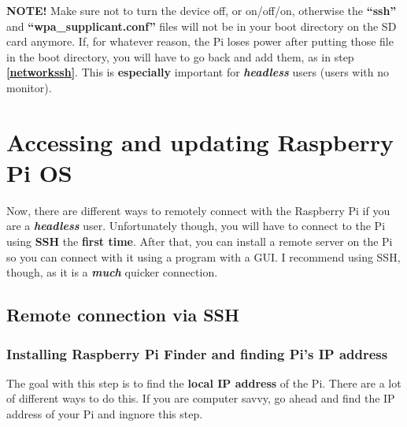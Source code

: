 \documentclass{article}
\begin{document}
\begin{enumerate}
\textbf{NOTE!} Make sure not to turn the device off, or on/off/on, otherwise the \textbf{``ssh''} and \textbf{``wpa\_supplicant.conf''} files will not be in your boot directory on the SD card anymore. If, for whatever reason, the Pi loses power after putting those file in the boot directory, you will have to go back and add them, as in step \textbf{\ref{networkssh}}. This is \textbf{especially} important for \textbf{\textit{headless}} users (users with no monitor).


\end{enumerate}

\section{Accessing and updating Raspberry Pi OS}

Now, there are different ways to remotely connect with the Raspberry Pi if you are a \textbf{\textit{headless}} user. Unfortunately though, you will have to connect to the Pi using \textbf{SSH} the \textbf{first time}. After that, you can install a remote server on the Pi so you can connect with it using a program with a GUI. I recommend using SSH, though, as it is a \textbf{\textit{much}} quicker connection.

\subsection{Remote connection via SSH}

\subsubsection{Installing Raspberry Pi Finder and finding Pi's IP address}

The goal with this step is to find the \textbf{local IP address} of the Pi. There are a lot of different ways to do this. If you are computer savvy, go ahead and find the IP address of your Pi and ingnore this step.
\end{document}
